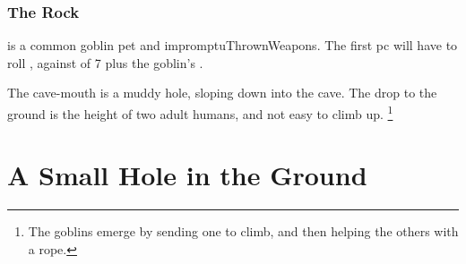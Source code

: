 \begin{multicols}{2}
\subsubsection{The Rock}
is a common goblin pet and \gls{impromptuThrownWeapons}.
The first \gls{pc} will have to roll , against  of 7 plus the goblin's .

The cave-mouth is a muddy hole, sloping down into the cave.
The drop to the ground is the height of two adult humans, and not easy to climb up.%
\footnote{The goblins emerge by sending one to climb, and then helping the others with a rope.}

\end{multicols}

\needspace{15em}
\section{A Small Hole in the Ground}
\renewcommand\npcsymbol{\gls{night}}
\label{goblinCaveEntrance}

